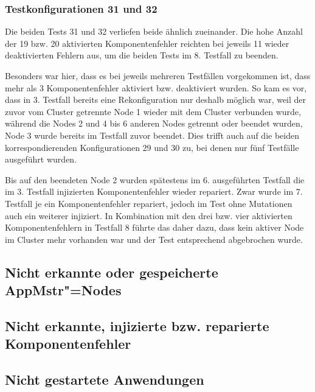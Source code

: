 \subsubsection{Testkonfigurationen 31 und 32}
\label{sec:noReconf3132}

Die beiden Tests 31 und 32 verliefen beide ähnlich zueinander.
Die hohe Anzahl der 19 bzw. 20 aktivierten Komponentenfehler reichten bei jeweils 11 wieder deaktivierten Fehlern aus, um die beiden Tests im 8. Testfall zu beenden.

Besonders war hier, dass es bei jeweils mehreren Testfällen vorgekommen ist, dass mehr als 3 Komponentenfehler aktiviert bzw. deaktiviert wurden.
So kam es vor, dass \zB in 3. Testfall bereits eine Rekonfiguration nur deshalb möglich war, weil der zuvor vom Cluster getrennte Node 1 wieder mit dem Cluster verbunden wurde, während die Nodes 2 und 4 bis 6 anderen Nodes getrennt oder beendet wurden, Node 3 wurde bereits im Testfall zuvor beendet.
Dies trifft auch auf die beiden korrespondierenden Konfigurationen 29 und 30 zu, bei denen nur fünf Testfälle ausgeführt wurden.

Bis auf den beendeten Node 2 wurden spätestens im 6. ausgeführten Testfall die im 3. Testfall injizierten Komponentenfehler wieder repariert.
Zwar wurde im 7. Testfall je ein Komponentenfehler repariert, jedoch im Test ohne Mutationen auch ein weiterer injiziert.
In Kombination mit den drei bzw. vier aktivierten Komponentenfehlern in Testfall 8 führte das daher dazu, dass kein aktiver Node im Cluster mehr vorhanden war und der Test entsprechend abgebrochen wurde.

\subsection{Nicht erkannte oder gespeicherte \ac{AppMstr}"=Nodes}
\label{sec:noDetectedHost2}




\subsection{Nicht erkannte, injizierte bzw. reparierte Komponentenfehler}
\label{sec:noDetectedFault}


\subsection{Nicht gestartete Anwendungen}
\label{sec:notStartedApps}



